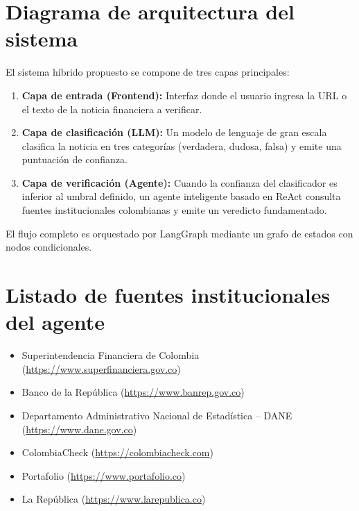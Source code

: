 \section{Diagrama de arquitectura del sistema}

El sistema híbrido propuesto se compone de tres capas principales:

\begin{enumerate}
    \item \textbf{Capa de entrada (Frontend):} Interfaz donde el usuario ingresa la URL o el texto de la noticia financiera a verificar.
    \item \textbf{Capa de clasificación (LLM):} Un modelo de lenguaje de gran escala clasifica la noticia en tres categorías (verdadera, dudosa, falsa) y emite una puntuación de confianza.
    \item \textbf{Capa de verificación (Agente):} Cuando la confianza del clasificador es inferior al umbral definido, un agente inteligente basado en ReAct consulta fuentes institucionales colombianas y emite un veredicto fundamentado.
\end{enumerate}

El flujo completo es orquestado por LangGraph mediante un grafo de estados con nodos condicionales.

\section{Listado de fuentes institucionales del agente}

\begin{itemize}
    \item Superintendencia Financiera de Colombia (\url{https://www.superfinanciera.gov.co})
    \item Banco de la República (\url{https://www.banrep.gov.co})
    \item Departamento Administrativo Nacional de Estadística -- DANE (\url{https://www.dane.gov.co})
    \item ColombiaCheck (\url{https://colombiacheck.com})
    \item Portafolio (\url{https://www.portafolio.co})
    \item La República (\url{https://www.larepublica.co})
\end{itemize}
